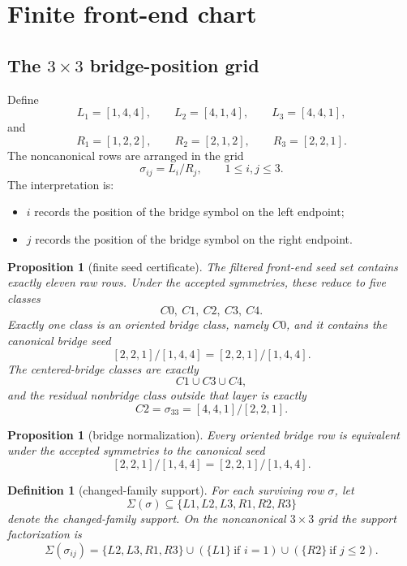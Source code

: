 \documentclass[11pt]{article}
\newtheorem{proposition}[theorem]{Proposition}
\newtheorem{definition}[theorem]{Definition}
\newcommand{\sig}[2]{\sigma_{#1#2}}
\newcommand{\CanL}{[2,2,1]}
\newcommand{\CanR}{[1,4,4]}
\newcommand{\CanSeed}{\CanL/\CanR}
\begin{document}
\section{Finite front-end chart}

\subsection{\texorpdfstring{The \(3\times 3\)}{The 3x3} bridge-position grid}

Define
\[
L_1=[1,4,4],\qquad L_2=[4,1,4],\qquad L_3=[4,4,1],
\]
and
\[
R_1=[1,2,2],\qquad R_2=[2,1,2],\qquad R_3=[2,2,1].
\]
The noncanonical rows are arranged in the grid
\[
\sig{i}{j}=L_i/R_j,\qquad 1\le i,j\le 3.
\]
The interpretation is:
\begin{itemize}[leftmargin=2.4em]
\item \(i\) records the position of the bridge symbol on the left endpoint;
\item \(j\) records the position of the bridge symbol on the right endpoint.
\end{itemize}

\begin{proposition}[finite seed certificate]
\label{prop:finite-chart}
The filtered front-end seed set contains exactly eleven raw rows.
Under the accepted symmetries, these reduce to five classes
\[
C0,\ C1,\ C2,\ C3,\ C4.
\]
Exactly one class is an oriented bridge class, namely \(C0\), and it contains
the canonical bridge seed
\[
\CanSeed=\CanL/\CanR.
\]
The centered-bridge classes are exactly
\[
C1\cup C3\cup C4,
\]
and the residual nonbridge class outside that layer is exactly
\[
C2=\sig33=[4,4,1]/[2,2,1].
\]
\end{proposition}

\begin{proposition}[bridge normalization]
\label{prop:bridge-normalization}
Every oriented bridge row is equivalent under the accepted symmetries to the
canonical seed
\[
\CanSeed=[2,2,1]/[1,4,4].
\]
\end{proposition}

\begin{definition}[changed-family support]
For each surviving row \(\sigma\), let
\[
\Sigma(\sigma)\subseteq\{L1,L2,L3,R1,R2,R3\}
\]
denote the changed-family support.
On the noncanonical \(3\times 3\) grid the support factorization is
\[
\Sigma(\sig{i}{j})
=
\{L2,L3,R1,R3\}
\cup (\{L1\}\ \text{if } i=1)
\cup (\{R2\}\ \text{if } j\le 2).
\]
\end{definition}
\end{document}
